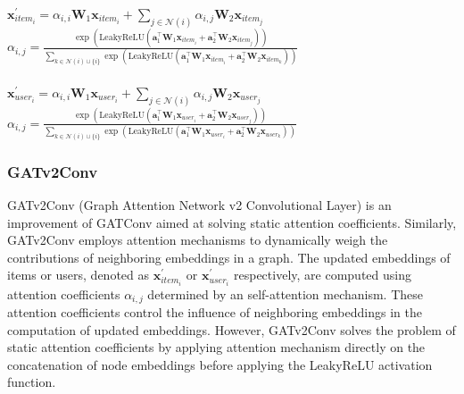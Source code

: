 \documentclass{scrartcl}
\begin{document}
\begin{center}
    $\mathbf{x}^{\prime}_{item_{i}} = \alpha_{i,i}\mathbf{W}_{1}\mathbf{x}_{item_{i}} + \sum_{j \in \mathcal{N}(i)} \alpha_{i,j}\mathbf{W}_{2}\mathbf{x}_{item_{j}}$\\
    $\alpha_{i,j} =
    \frac{
    \exp\left(\mathrm{LeakyReLU}\left(
    \mathbf{a}^{\top}_{1} \mathbf{W}_{1}\mathbf{x}_{item_{i}}
    + \mathbf{a}^{\top}_{2} \mathbf{W}_{2}\mathbf{x}_{item_{j}}
    \right)\right)}
    {\sum_{k \in \mathcal{N}(i) \cup \{ i \}}
    \exp\left(\mathrm{LeakyReLU}\left(
    \mathbf{a}^{\top}_{1} \mathbf{W}_{1}\mathbf{x}_{item_{i}}
    + \mathbf{a}^{\top}_{2}\mathbf{W}_{2}\mathbf{x}_{item_{k}}
    \right)\right)}$ \\~\\
    $\mathbf{x}^{\prime}_{user_{i}} = \alpha_{i,i}\mathbf{W}_{1}\mathbf{x}_{user_{i}} + \sum_{j \in \mathcal{N}(i)} \alpha_{i,j}\mathbf{W}_{2}\mathbf{x}_{user_{j}}$\\
    $\alpha_{i,j} =
    \frac{
    \exp\left(\mathrm{LeakyReLU}\left(
    \mathbf{a}^{\top}_{1} \mathbf{W}_{1}\mathbf{x}_{user_{i}}
    + \mathbf{a}^{\top}_{2} \mathbf{W}_{2}\mathbf{x}_{user_{j}}
    \right)\right)}
    {\sum_{k \in \mathcal{N}(i) \cup \{ i \}}
    \exp\left(\mathrm{LeakyReLU}\left(
    \mathbf{a}^{\top}_{1} \mathbf{W}_{1}\mathbf{x}_{user_{i}}
    + \mathbf{a}^{\top}_{2}\mathbf{W}_{2}\mathbf{x}_{user_{k}}
    \right)\right)}$
\end{center}

\subsubsection{GATv2Conv\cite{gatv2conv}} 

\quad GATv2Conv (Graph Attention Network v2 Convolutional Layer) is an improvement of GATConv aimed at solving static attention coefficients. Similarly, GATv2Conv employs attention mechanisms to dynamically weigh the contributions of neighboring embeddings in a graph. The updated embeddings of items or users, denoted as $\mathbf{x}^{\prime}_{item_i}$ or $\mathbf{x}^{\prime}_{user_i}$ respectively, are computed using attention coefficients $\alpha_{i,j}$ determined by an self-attention mechanism. These attention coefficients control the influence of neighboring embeddings in the computation of updated embeddings. However, GATv2Conv solves the problem of static attention coefficients by applying attention mechanism directly on the concatenation of node embeddings before applying the LeakyReLU activation function. \\
\end{document}
